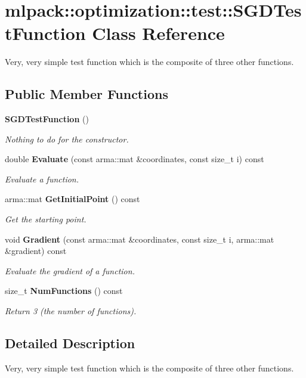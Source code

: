 \section{mlpack\+:\+:optimization\+:\+:test\+:\+:S\+G\+D\+Test\+Function Class Reference}
\label{classmlpack_1_1optimization_1_1test_1_1SGDTestFunction}


Very, very simple test function which is the composite of three other functions.  


\subsection*{Public Member Functions}
\begin{DoxyCompactItemize}
\item 
{\bf S\+G\+D\+Test\+Function} ()
\begin{DoxyCompactList}\small\item\em Nothing to do for the constructor. \end{DoxyCompactList}\item 
double {\bf Evaluate} (const arma\+::mat \&coordinates, const size\+\_\+t i) const 
\begin{DoxyCompactList}\small\item\em Evaluate a function. \end{DoxyCompactList}\item 
arma\+::mat {\bf Get\+Initial\+Point} () const 
\begin{DoxyCompactList}\small\item\em Get the starting point. \end{DoxyCompactList}\item 
void {\bf Gradient} (const arma\+::mat \&coordinates, const size\+\_\+t i, arma\+::mat \&gradient) const 
\begin{DoxyCompactList}\small\item\em Evaluate the gradient of a function. \end{DoxyCompactList}\item 
size\+\_\+t {\bf Num\+Functions} () const 
\begin{DoxyCompactList}\small\item\em Return 3 (the number of functions). \end{DoxyCompactList}\end{DoxyCompactItemize}


\subsection{Detailed Description}
Very, very simple test function which is the composite of three other functions. 

